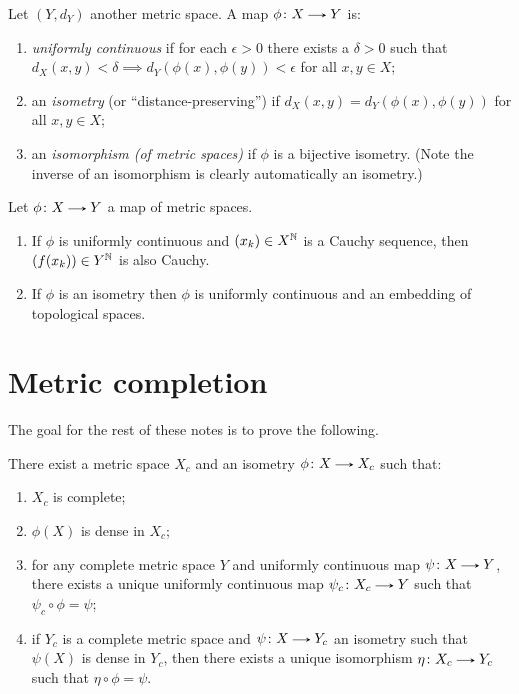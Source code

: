 \begin{definition}
  Let $(Y, d_Y)$ another metric space. A map $\phi \c X \to Y$ is:
  \begin{enumerate}
  \item \textit{uniformly continuous} if for each $\epsilon > 0$ there
    exists a $\delta > 0$ such that $d_X(x,y) < \delta \implies
    d_Y(\phi(x),\phi(y)) < \epsilon$ for all $x,y \in X$;
  \item an \textit{isometry} (or ``distance-preserving'') if $d_X(x,y)
    = d_Y(\phi(x),\phi(y))$ for all $x,y \in X$;
  \item an \textit{isomorphism (of metric spaces)} if $\phi$ is a
    bijective isometry. (Note the inverse of an isomorphism is clearly
    automatically an isometry.)
  \end{enumerate}
\end{definition}

\begin{exercise}
  \label{maps}
  Let $\phi \c X \to Y$ a map of metric spaces.
  \begin{enumerate}
  \item If $\phi$ is uniformly continuous and $(x_k) \in X^{\mathbb{N}}$ is a
    Cauchy sequence, then $(f(x_k)) \in Y^{\mathbb{N}}$ is also Cauchy.
  \item If $\phi$ is an isometry then $\phi$ is uniformly continuous
    and an embedding of topological spaces.
  \end{enumerate}
\end{exercise}


\section{Metric completion}

The goal for the rest of these notes is to prove the following.

\begin{proposition}
  \label{completion}
  There exist a metric space $X_c$ and an isometry $\phi \c X \to X_c$
  such that:
  \begin{enumerate}
  \item $X_c$ is complete;
  \item $\phi(X)$ is dense in $X_c$;
  \item for any complete metric space $Y$ and uniformly continuous map
    $\psi \c X \to Y$, there exists a unique uniformly continuous map
    $\psi_c \c X_c \to Y$ such that $\psi_c \circ \phi = \psi$;
  \item if $Y_c$ is a complete metric space and $\psi \c X \to Y_c$ an
    isometry such that $\psi(X)$ is dense in $Y_c$, then there exists
    a unique isomorphism $\eta \c X_c \to Y_c$ such that $\eta \circ
    \phi = \psi$.
  \end{enumerate}
\end{proposition}

